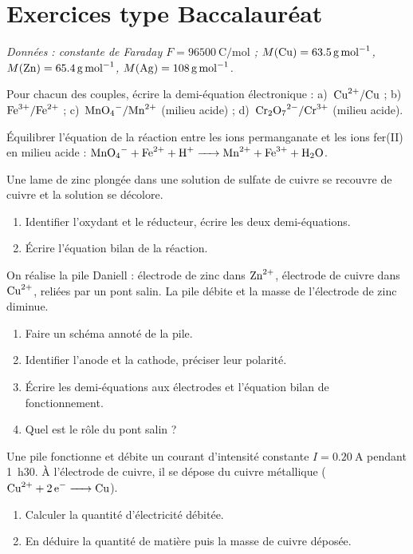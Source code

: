 \section{Exercices type Baccalauréat}
\textit{Données : constante de Faraday $F = \SI{96500}{\coulomb\per\mol}$ ;
$M(\ce{Cu})=\SI{63.5}{\gram\per\mol}$, $M(\ce{Zn})=\SI{65.4}{\gram\per\mol}$,
$M(\ce{Ag})=\SI{108}{\gram\per\mol}$.}


\exo{} Pour chacun des couples, écrire la demi-équation électronique :
a)~$\ce{Cu^2+}/\ce{Cu}$ ; b)~$\ce{Fe^3+}/\ce{Fe^2+}$ ; c)~$\ce{MnO4-}/\ce{Mn^2+}$
(milieu acide) ; d)~$\ce{Cr2O7^2-}/\ce{Cr^3+}$ (milieu acide).

\exo{} Équilibrer l'équation de la réaction entre les ions permanganate et
les ions fer(II) en milieu acide :
$\ce{MnO4- + Fe^2+ + H+ -> Mn^2+ + Fe^3+ + H2O}$.

\exo{} Une lame de zinc plongée dans une solution de sulfate de cuivre se
recouvre de cuivre et la solution se décolore.
\begin{enumerate}[label=\arabic*)]
\item Identifier l'oxydant et le réducteur, écrire les deux demi-équations.
\item Écrire l'équation bilan de la réaction.
\end{enumerate}


\exo{} On réalise la pile Daniell : électrode de zinc dans $\ce{Zn^2+}$,
électrode de cuivre dans $\ce{Cu^2+}$, reliées par un pont salin. La pile débite et
la masse de l'électrode de zinc diminue.
\begin{enumerate}[label=\arabic*)]
\item Faire un schéma annoté de la pile.
\item Identifier l'anode et la cathode, préciser leur polarité.
\item Écrire les demi-équations aux électrodes et l'équation bilan de fonctionnement.
\item Quel est le rôle du pont salin ?
\end{enumerate}

\exo{} Une pile fonctionne et débite un courant d'intensité constante
$I = \SI{0.20}{\ampere}$ pendant \SI{1}{\hour}30. À l'électrode de cuivre, il se
dépose du cuivre métallique ($\ce{Cu^2+ + 2 e- -> Cu}$).
\begin{enumerate}[label=\arabic*)]
\item Calculer la quantité d'électricité débitée.
\item En déduire la quantité de matière puis la masse de cuivre déposée.
\end{enumerate}

